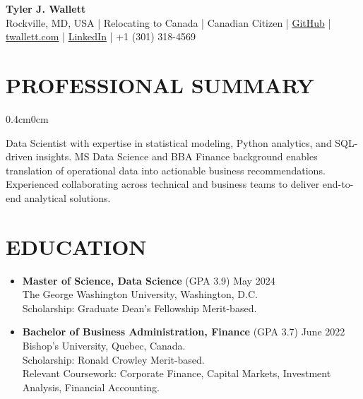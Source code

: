 \documentclass[a4paper,9pt]{extarticle}
\begin{document}
\thispagestyle{firstpage}

\begin{center}
\textbf{\Huge Tyler J. Wallett }\\[3pt] %
Rockville, MD, USA | Relocating to Canada | Canadian Citizen | \href{https://github.com/twallett}{GitHub} | \href{https://www.twallett.com}{twallett.com} | \href{https://www.linkedin.com/in/twallett/}{LinkedIn} | +1 (301) 318-4569  %
\end{center}

\section*{PROFESSIONAL SUMMARY}

\begin{adjustwidth}{0.4cm}{0cm}

Data Scientist with expertise in statistical modeling, Python analytics, and SQL-driven insights. MS Data Science and BBA Finance background enables translation of operational data into actionable business recommendations. Experienced collaborating across technical and business teams to deliver end-to-end analytical solutions.

\end{adjustwidth}

\section*{EDUCATION}

\begin{itemize}[leftmargin=0.4cm, label={}]
    \item \textbf{Master of Science, Data Science} (GPA 3.9) \hfill May 2024 \\ 
    The George Washington University, Washington, D.C. \\ 
    Scholarship: Graduate Dean's Fellowship Merit-based.
\end{itemize}

\noindent
\begin{itemize}[leftmargin=0.4cm, label={}]
    \item \textbf{Bachelor of Business Administration, Finance} (GPA 3.7) \hfill June 2022 \\
    Bishop's University, Quebec, Canada. \\ 
    Scholarship: Ronald Crowley Merit-based. \\
    Relevant Coursework: Corporate Finance, Capital Markets, Investment Analysis, Financial Accounting.
\end{itemize}
\end{document}
